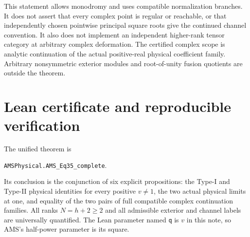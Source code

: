 \documentclass[10pt,a4paper]{article}
\newcommand{\lean}[1]{{\small\nolinkurl{#1}}}
\newenvironment{revision}{\begingroup}{\endgroup}
\begin{document}
\begin{revision}
This statement allows monodromy and uses compatible normalization branches.
It does not assert that every complex point is regular or reachable, or
that independently chosen pointwise principal square roots give the
continued channel convention. It also does not implement an independent
higher-rank tensor category at arbitrary complex deformation. The certified
complex scope is analytic continuation of the actual positive-real
physical coefficient family. Arbitrary nonsymmetric exterior modules and
root-of-unity fusion quotients are outside the theorem.

\section{Lean certificate and reproducible verification}\label{sec:audit}
The unified theorem is
\begin{center}
 \lean{AMSPhysical.AMS_Eq35_complete}.
\end{center}
Its conclusion is the conjunction of six explicit propositions: the
Type-I and Type-II physical identities for every positive $v\ne1$, the
two actual physical limits at one, and equality of the two pairs of full
compatible complex continuation families. All ranks $N=h+2\ge2$ and all
admissible exterior and channel labels are universally quantified.
The Lean parameter named \lean{q} is $v$ in this note, so AMS's
half-power parameter is its square.


\end{revision}
\end{document}
